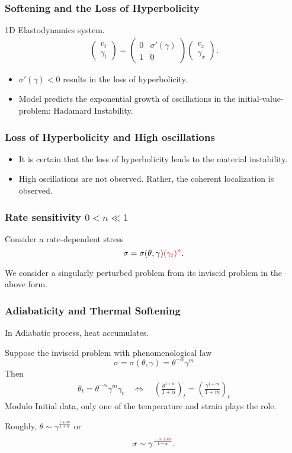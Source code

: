 \documentclass{beamer}
\def\red{\color{red}}
\def\blue{\color{blue}}
\begin{document}
\begin{frame}
 \frametitle{Softening and the Loss of Hyperbolicity}
 1D Elastodynamics system.
 \begin{align*}
  \begin{pmatrix}
   v_t\\ \gamma_t
  \end{pmatrix}
  = \begin{pmatrix}
   0 &\sigma'(\gamma)\\ 1 & 0
  \end{pmatrix} 
  \begin{pmatrix}
   v_x\\ \gamma_x
  \end{pmatrix}.
 \end{align*}
 \vfill
 \begin{itemize}
  \item $\sigma'(\gamma)<0$ results in the loss of hyperbolicity.
  \item Model predicts the exponential growth of oscillations in the initial-value-problem: {\blue Hadamard Instability}.
 \end{itemize}
\end{frame}



\begin{frame}
 \frametitle{Loss of Hyperbolicity and High oscillations}
 \begin{itemize}
  \item It is certain that the loss of hyperbolicity leads to the material instability.
  \item High oscillations are not observed. Rather, the coherent localization is observed.
 \end{itemize}
 \vfill
\end{frame}

\begin{frame}
 \frametitle{Rate sensitivity $0<n\ll1$}
 Consider a rate-dependent stress
 $$\sigma=\sigma(\theta,\gamma){\red (\gamma_t)^n}.$$
 
 We consider a singularly perturbed problem from its inviscid problem in the above form.
 \vfill
\end{frame}

\begin{frame}
 \frametitle{Adiabaticity and Thermal Softening}
  In Adiabatic process, heat accumulates.  
  
  Suppose the inviscid problem with phenomenological law
 $$\sigma=\sigma(\theta,\gamma)=\theta^{-\alpha}\gamma^m$$
 Then
 \begin{align*}
  \theta_t = \theta^{-\alpha}\gamma^m\gamma_t \quad \Longleftrightarrow \quad 
  \left(\frac{\theta^{1+\alpha}}{1+\alpha}\right)_t = \left(\frac{\gamma^{1+m}}{1+m}\right)_t
 \end{align*}
 Modulo Initial data, only one of the temperature and strain plays the role.
 
 Roughly, $\theta\sim \gamma^{\frac{1+m}{1+\alpha}}$ or
 $$\sigma \sim \gamma^{\frac{\red-\alpha+m}{1+\alpha}}.$$
 \vfill
\end{frame}
\end{document}
